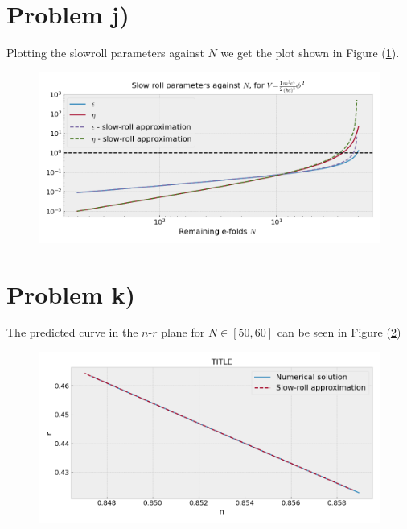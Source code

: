 \documentclass[reprint,english,notitlepage]{revtex4-1}  %
\numberwithin{equation}{section}
\begin{document}
\section{Problem j)}
Plotting the slowroll parameters against $N$ we get the plot shown in Figure
(\ref{fig:quadratic_slowroll-N}).
\begin{figure}[h!]
	\includegraphics[width=\linewidth]{QuadraticPotential_slowroll-N.png}
	\caption{}
	\label{fig:quadratic_slowroll-N}
\end{figure}

\section{Problem k)}
The predicted curve in the $n$-$r$ plane for
$N\in[50,60]$ can be seen in Figure (\ref{fig:quadratic_slowroll-nr})
\begin{figure}[h!]
	\includegraphics[width=\linewidth]{QuadraticPotential_slowroll-nr.png}
	\caption{}
	\label{fig:quadratic_slowroll-nr}
\end{figure}
\end{document}
